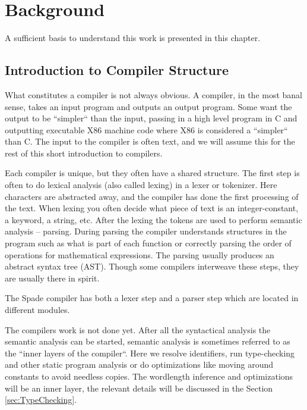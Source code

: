 \chapter{Background}
\label{chaBackground}
A sufficient basis to understand this work is presented in this chapter.

% 


\section{Introduction to Compiler Structure}
What constitutes a compiler is not always obvious. A compiler, in the most banal sense, takes an input program and outputs an output program. Some want the output to be ``simpler`` than the input, passing in a high level program in C and outputting executable X86 machine code where X86 is considered a ``simpler`` than C. The input to the compiler is often text, and we will assume this for the rest of this short introduction to compilers.

Each compiler is unique, but they often have a shared structure. The first step is often to do lexical analysis (also called lexing) in a lexer or tokenizer. Here characters are abstracted away, and the compiler has done the first processing of the text. When lexing you often decide what piece of text is an integer-constant, a keyword, a string, etc. After the lexing the tokens are used to perform semantic analysis -- parsing. During parsing the compiler understands structures in the program such as what is part of each function or correctly parsing the order of operations for mathematical expressions. The parsing usually produces an abstract syntax tree (AST). Though some compilers interweave these steps, they are usually there in spirit.

The Spade compiler has both a lexer step and a parser step which are located in different modules.

The compilers work is not done yet. After all the syntactical analysis the semantic analysis can be started, semantic analysis is sometimes referred to as the ``inner layers of the compiler``. Here we resolve identifiers, run type-checking and other static program analysis or do optimizations like moving around constants to avoid needless copies. The wordlength inference and optimizations will be an inner layer, the relevant details will be discussed in the Section \ref{sec:TypeChecking}. 

